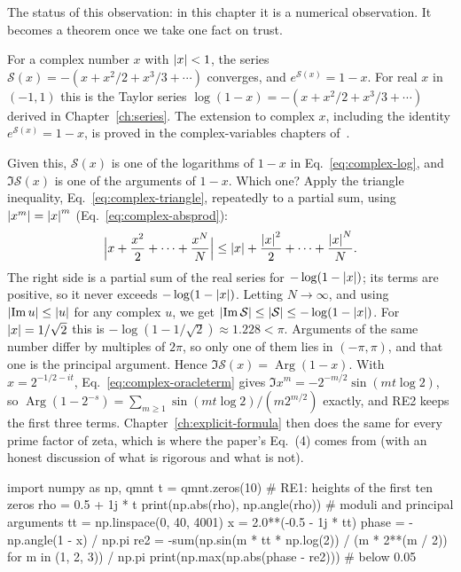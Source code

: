 The status of this observation: in this chapter it is a numerical observation. It becomes a theorem once we take one fact on trust.
\begin{beyond}
For a complex number $x$ with $\left\lvert x\right\rvert<1$, the series $\mathcal S(x)=-(x+x^2/2+x^3/3+\cdots)$ converges, and $e^{\mathcal S(x)}=1-x$. For real $x$ in $(-1,1)$ this is the Taylor series $\log(1-x)=-(x+x^2/2+x^3/3+\cdots)$ derived in Chapter~\ref{ch:series}. The extension to complex $x$, including the identity $e^{\mathcal S(x)}=1-x$, is proved in the complex-variables chapters of~\cite{rhb}.
\end{beyond}
Given this, $\mathcal S(x)$ is one of the logarithms of $1-x$ in Eq.~\eqref{eq:complex-log}, and $\Im\mathcal S(x)$ is one of the arguments of $1-x$. Which one? Apply the triangle inequality, Eq.~\eqref{eq:complex-triangle}, repeatedly to a partial sum, using $\left\lvert x^m\right\rvert=\left\lvert x\right\rvert^m$ (Eq.~\eqref{eq:complex-absprod}):
\[
\Bigl\lvert x+\frac{x^2}{2}+\cdots+\frac{x^N}{N}\Bigr\rvert\le\left\lvert x\right\rvert+\frac{\left\lvert x\right\rvert^2}{2}+\cdots+\frac{\left\lvert x\right\rvert^N}{N}.
\]
The right side is a partial sum of the real series for $-\log(1-\left\lvert x\right\rvert)$; its terms are positive, so it never exceeds $-\log(1-\left\lvert x\right\rvert)$. Letting $N\to\infty$, and using $\left\lvert \operatorname{Im} u\right\rvert\le\left\lvert u\right\rvert$ for any complex $u$, we get $\left\lvert \operatorname{Im}\mathcal S\right\rvert\le\left\lvert \mathcal S\right\rvert\le-\log(1-\left\lvert x\right\rvert)$. For $\left\lvert x\right\rvert=1/\sqrt2$ this is $-\log(1-1/\sqrt2)\approx1.228<\pi$. Arguments of the same number differ by multiples of $2\pi$, so only one of them lies in $(-\pi,\pi)$, and that one is the principal argument. Hence $\Im\mathcal S(x)=\operatorname{Arg}(1-x)$. With $x=2^{-1/2-it}$, Eq.~\eqref{eq:complex-oracleterm} gives $\Im x^m=-2^{-m/2}\sin(mt\log2)$, so $\operatorname{Arg}(1-2^{-s})=\sum_{m\ge1}\sin(mt\log2)/(m2^{m/2})$ exactly, and RE2 keeps the first three terms. Chapter~\ref{ch:explicit-formula} then does the same for every prime factor of zeta, which is where the paper's Eq.~(4) comes from (with an honest discussion of what is rigorous and what is not).

\begin{pycode}
import numpy as np, qmnt
t = qmnt.zeros(10)                 # RE1: heights of the first ten zeros
rho = 0.5 + 1j * t
print(np.abs(rho), np.angle(rho))  # moduli and principal arguments
tt = np.linspace(0, 40, 4001)
x = 2.0**(-0.5 - 1j * tt)
phase = -np.angle(1 - x) / np.pi
re2 = -sum(np.sin(m * tt * np.log(2)) / (m * 2**(m / 2))
           for m in (1, 2, 3)) / np.pi
print(np.max(np.abs(phase - re2)))  # below 0.05
\end{pycode}


